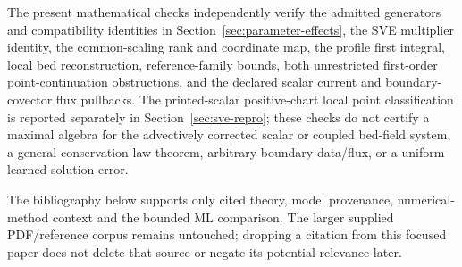 \documentclass[11pt]{article}
\theoremstyle{definition}
\begin{document}
The present mathematical checks independently verify the admitted generators
and compatibility identities in Section~\ref{sec:parameter-effects}, the SVE multiplier identity,
the common-scaling rank and coordinate map, the profile first integral, local
bed reconstruction, reference-family bounds, both unrestricted first-order
point-continuation obstructions, and the declared scalar current and
boundary-covector flux pullbacks. The printed-scalar positive-chart local
point classification is reported separately in Section~\ref{sec:sve-repro};
these checks do not certify a maximal algebra for the advectively corrected
scalar or coupled bed-field system, a general conservation-law theorem,
arbitrary boundary data/flux, or a uniform learned solution error.

The bibliography below supports only cited theory, model provenance,
numerical-method context and the bounded ML comparison. The larger supplied
PDF/reference corpus remains untouched; dropping a citation from this focused
paper does not delete that source or negate its potential relevance later.
\end{document}
